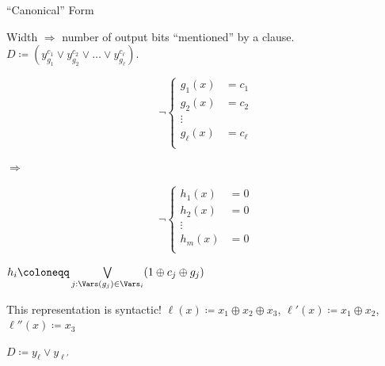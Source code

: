 \begin{frame}{``Canonical'' Form}

    Width $\Rightarrow$ number of output bits ``mentioned'' by a clause.
    $D \coloneqq (y^{c_1}_{g_1} \lor y^{c_2}_{g_2} \lor \dots \lor y^{c_{\ell}}_{g_{\ell}})$.

    \vspace{0.2cm}
    \pause
    \begin{minipage}[c]{0.45\linewidth}
        \begin{equation*}
            \neg \left\{
              \begin{aligned}
                  g_1(x) &= c_1 \\
                  g_2(x) &= c_2 \\
                  \vdots \\
                  g_{\ell}(x) &= c_{\ell} \\
              \end{aligned}
            \right.
        \end{equation*}
    \end{minipage}
    \pause
    \begin{minipage}[c]{0.05\linewidth}
        $\Rightarrow$
    \end{minipage}
    \begin{minipage}[c]{0.45\linewidth}
        \begin{equation*}
            \neg \left\{
              \begin{aligned}
                  h_1(x) &= 0 \\
                  h_2(x) &= 0 \\
                  \vdots \\
                  h_{m}(x) &= 0 \\
              \end{aligned}
            \right.
        \end{equation*}
    \end{minipage}

    \pause
    \vspace{0.2cm}
    $h_i \coloneqq \bigvee\limits_{j : \Vars(g_j) \in \Vars_i} (1 \oplus c_j \oplus g_j)$

    \pause
    \vspace{0.2cm}
    This representation is \alert{syntactic}!
    \pause
    $\ell(x) \coloneqq x_1 \oplus x_2 \oplus x_3$, $\ell'(x) \coloneqq x_1 \oplus x_2$, $\ell''(x)
    \coloneqq x_3$

    \pause
    \vspace{0.2cm}
    \begin{minipage}{0.15\linewidth}
        \centering
        
    \end{minipage}
    \begin{minipage}{0.4\linewidth}
        \centering
        $D \coloneqq y_{\ell} \lor y_{\ell'}$
        

\end{minipage}
\end{frame}
